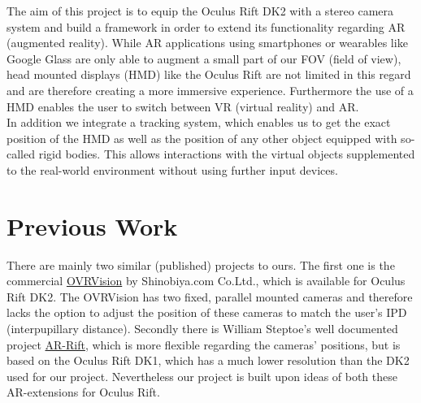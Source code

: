 The aim of this project is to equip the Oculus Rift DK2 with a stereo camera system and build a framework in order to extend its functionality regarding AR (augmented reality). While AR applications using smartphones or wearables like Google Glass are only able to augment a small part of our FOV (field of view), head mounted displays (HMD) like the Oculus Rift are not limited in this regard and are therefore creating a more immersive experience. Furthermore the use of a HMD enables the user to switch between VR (virtual reality) and AR.\\
In addition we integrate a tracking system, which enables us to get the exact position of the HMD as well as the position of any other object equipped with so-called rigid bodies. This allows interactions with the virtual objects supplemented to the real-world environment without using further input devices.

\section*{Previous Work}
There are mainly two similar (published) projects to ours. The first one is the commercial \href{http://ovrvision.com/}{OVRVision}\cite{ovrvision} by Shinobiya.com Co.Ltd., which is available for Oculus Rift DK2. The OVRVision has two fixed, parallel mounted cameras and therefore lacks the option to adjust the position of these cameras to match the user's IPD (interpupillary distance). Secondly there is William Steptoe's well documented project \href{http://willsteptoe.com/post/66968953089/ar-rift-part-1}{AR-Rift}\cite{arrift}, which is more flexible regarding the cameras' positions, but is based on the Oculus Rift DK1, which has a much lower resolution than the DK2 used for our project. Nevertheless our project is built upon ideas of both these AR-extensions for Oculus Rift.